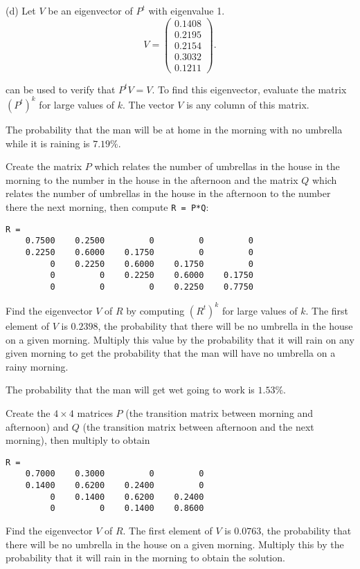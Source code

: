 (d) \ans Let $V$ be an eigenvector of $P^t$ with eigenvalue 1.
\[
V = \left(\begin{array}{r} 0.1408 \\ 0.2195 \\ 0.2154 \\ 0.3032
\\ 0.1211 \end{array}\right).
\]

\soln \Matlab can be used to verify that $P^tV = V$.  To find this
eigenvector, evaluate the matrix $(P^t)^k$ for large values of $k$.
The vector $V$ is any column of this matrix.

\ans The probability that the man will be at home in the morning with
no umbrella while it is raining is $7.19\%$. 

\soln Create the matrix $P$ which relates the number of umbrellas in the
house in the morning to the number in the house in the afternoon and the
matrix $Q$ which relates the number of umbrellas in the house in the
afternoon to the number there the next morning, then compute {\tt R = P*Q}:
\begin{verbatim}
R =
    0.7500    0.2500         0         0         0
    0.2250    0.6000    0.1750         0         0
         0    0.2250    0.6000    0.1750         0
         0         0    0.2250    0.6000    0.1750
         0         0         0    0.2250    0.7750
\end{verbatim}
Find the eigenvector $V$ of $R$ by computing $(R^t)^k$ for large values
of $k$.  The first element of $V$ is $0.2398$, the probability that there
will be no umbrella in the house on a given morning.  Multiply this
value by the probability that it will rain on any given morning to get
the probability that the man will have no umbrella on a rainy morning.


\ans The probability that the man will get wet going to work is $1.53\%$.

\soln Create the $4 \times 4$ matrices $P$ (the transition matrix between
morning and afternoon) and $Q$ (the transition matrix between afternoon
and the next morning), then multiply to obtain \begin{verbatim}
R =
    0.7000    0.3000         0         0
    0.1400    0.6200    0.2400         0
         0    0.1400    0.6200    0.2400
         0         0    0.1400    0.8600
\end{verbatim}
Find the eigenvector $V$ of $R$.  The first element of $V$ is $0.0763$,
the probability that there will be no umbrella in the house on a given
morning.  Multiply this by the probability that it will rain in the
morning to obtain the solution.

